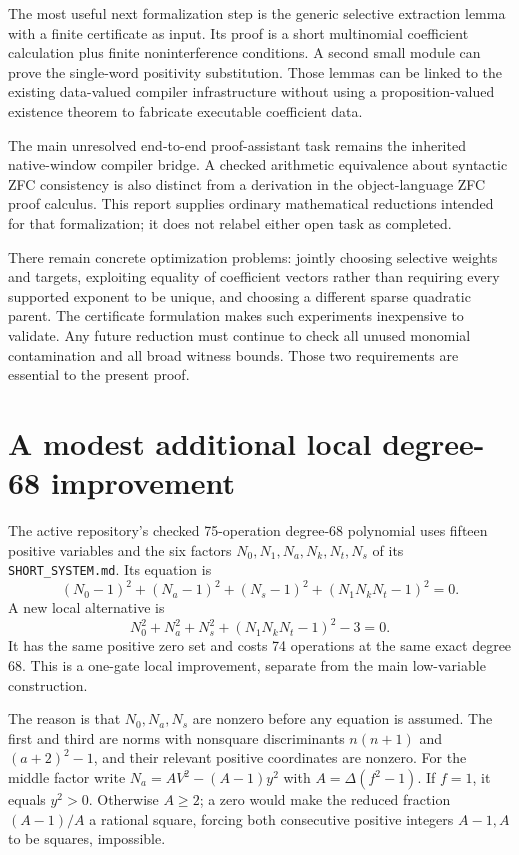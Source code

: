 \documentclass[11pt,letterpaper]{article}
\theoremstyle{definition}\newtheorem{definition}[theorem]{Definition}
\newcommand{\file}[1]{{\small\nolinkurl{#1}}}
\begin{document}
The most useful next formalization step is the generic selective extraction
lemma with a finite certificate as input. Its proof is a short multinomial
coefficient calculation plus finite noninterference conditions. A second
small module can prove the single-word positivity substitution. Those
lemmas can be linked to the existing data-valued compiler infrastructure
without using a proposition-valued existence theorem to fabricate
executable coefficient data.

The main unresolved end-to-end proof-assistant task remains the inherited
native-window compiler bridge. A checked arithmetic equivalence about
syntactic ZFC consistency is also distinct from a derivation in the
object-language ZFC proof calculus. This report supplies ordinary
mathematical reductions intended for that formalization; it does not
relabel either open task as completed.

There remain concrete optimization problems: jointly choosing selective
weights and targets, exploiting equality of coefficient vectors rather
than requiring every supported exponent to be unique, and choosing a
different sparse quadratic parent. The certificate formulation makes such
experiments inexpensive to validate. Any future reduction must continue
to check all unused monomial contamination and all broad witness bounds.
Those two requirements are essential to the present proof.

\appendix
\section{A modest additional local degree-68 improvement}
\label{app:p74}

The active repository's checked 75-operation degree-68 polynomial uses
fifteen positive variables and the six factors $N_0,N_1,N_a,N_k,N_t,N_s$
of its \file{SHORT_SYSTEM.md}. Its equation is
\[
(N_0-1)^2+(N_a-1)^2+(N_s-1)^2+(N_1N_kN_t-1)^2=0.
\]
A new local alternative is
\begin{equation}
N_0^2+N_a^2+N_s^2+(N_1N_kN_t-1)^2-3=0.
\label{eq:p74}
\end{equation}
It has the same positive zero set and costs 74 operations at the same
exact degree 68. This is a one-gate local improvement, separate from the
main low-variable construction.

The reason is that $N_0,N_a,N_s$ are nonzero before any equation is
assumed. The first and third are norms with nonsquare discriminants
$n(n+1)$ and $(a+2)^2-1$, and their relevant positive coordinates are
nonzero. For the middle factor write
$N_a=A V^2-(A-1)y^2$ with $A=\Delta(f^2-1)$. If $f=1$, it equals
$y^2>0$. Otherwise $A\ge2$; a zero would make the reduced fraction
$(A-1)/A$ a rational square, forcing both consecutive positive integers
$A-1,A$ to be squares, impossible.
\end{document}
